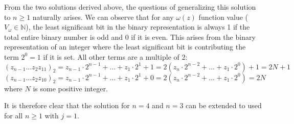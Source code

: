 \documentclass[12pt,a4paper]{article}
\begin{document}
From the two solutions derived above, the questions of generalizing this solution to \(n \ge 1\) naturally arises. We can observe that for any \(\omega(z)\) function value (\(V_{\omega} \in \mathbb{N}\)), the least significant bit in the binary representation is always 1 if the total entire binary number is odd and 0 if it is even. This arises from the binary representation of an integer where the least significant bit is contributing the term \(2^0 = 1\) if it is set. All other terms are a multiple of 2:
\[
(z_{n-1}...z_2z_11)_2 = z_{n-1}\cdot2^{n-1} + ... + z_1\cdot2^{1} + 1 = 2(z_n\cdot2^{n-2} + ... + z_1\cdot 2^{0}) + 1 = 2N + 1
\] 
\[
(z_{n-1}...z_2z_10)_2 = z_{n-1}\cdot2^{n-1} + ... + z_1\cdot2^{1} + 0 = 2(z_n\cdot2^{n-2} + ... + z_1\cdot 2^{0}) = 2N
\] where \(N\) is some positive integer.

It is therefore clear that the solution for \(n=4\) and \(n=3\) can be extended to used for all \(n \ge 1\) with \(j=1\).
\end{document}
